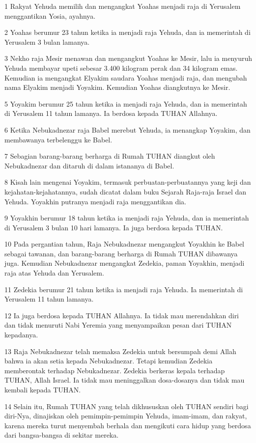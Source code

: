 \par 1 Rakyat Yehuda memilih dan mengangkat Yoahas menjadi raja di Yerusalem menggantikan Yosia, ayahnya.
\par 2 Yoahas berumur 23 tahun ketika ia menjadi raja Yehuda, dan ia memerintah di Yerusalem 3 bulan lamanya.
\par 3 Nekho raja Mesir menawan dan mengangkut Yoahas ke Mesir, lalu ia menyuruh Yehuda membayar upeti sebesar 3.400 kilogram perak dan 34 kilogram emas. Kemudian ia mengangkat Elyakim saudara Yoahas menjadi raja, dan mengubah nama Elyakim menjadi Yoyakim. Kemudian Yoahas diangkutnya ke Mesir.
\par 5 Yoyakim berumur 25 tahun ketika ia menjadi raja Yehuda, dan ia memerintah di Yerusalem 11 tahun lamanya. Ia berdosa kepada TUHAN Allahnya.
\par 6 Ketika Nebukadnezar raja Babel merebut Yehuda, ia menangkap Yoyakim, dan membawanya terbelenggu ke Babel.
\par 7 Sebagian barang-barang berharga di Rumah TUHAN diangkut oleh Nebukadnezar dan ditaruh di dalam istananya di Babel.
\par 8 Kisah lain mengenai Yoyakim, termasuk perbuatan-perbuatannya yang keji dan kejahatan-kejahatannya, sudah dicatat dalam buku Sejarah Raja-raja Israel dan Yehuda. Yoyakhin putranya menjadi raja menggantikan dia.
\par 9 Yoyakhin berumur 18 tahun ketika ia menjadi raja Yehuda, dan ia memerintah di Yerusalem 3 bulan 10 hari lamanya. Ia juga berdosa kepada TUHAN.
\par 10 Pada pergantian tahun, Raja Nebukadnezar mengangkut Yoyakhin ke Babel sebagai tawanan, dan barang-barang berharga di Rumah TUHAN dibawanya juga. Kemudian Nebukadnezar mengangkat Zedekia, paman Yoyakhin, menjadi raja atas Yehuda dan Yerusalem.
\par 11 Zedekia berumur 21 tahun ketika ia menjadi raja Yehuda. Ia memerintah di Yerusalem 11 tahun lamanya.
\par 12 Ia juga berdosa kepada TUHAN Allahnya. Ia tidak mau merendahkan diri dan tidak menuruti Nabi Yeremia yang menyampaikan pesan dari TUHAN kepadanya.
\par 13 Raja Nebukadnezar telah memaksa Zedekia untuk bersumpah demi Allah bahwa ia akan setia kepada Nebukadnezar. Tetapi kemudian Zedekia memberontak terhadap Nebukadnezar. Zedekia berkeras kepala terhadap TUHAN, Allah Israel. Ia tidak mau meninggalkan dosa-dosanya dan tidak mau kembali kepada TUHAN.
\par 14 Selain itu, Rumah TUHAN yang telah dikhususkan oleh TUHAN sendiri bagi diri-Nya, dinajiskan oleh pemimpin-pemimpin Yehuda, imam-imam, dan rakyat, karena mereka turut menyembah berhala dan mengikuti cara hidup yang berdosa dari bangsa-bangsa di sekitar mereka.
